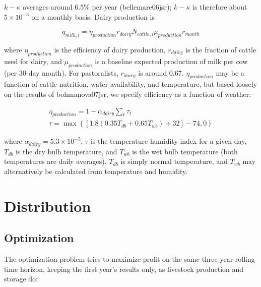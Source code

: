 \documentclass[letter,12pt]{article}
\begin{document}
$k-\kappa$ averages around 6.5\% per year (bellemare06jsr); $k-\kappa$ is therefore about $5 \times 10^{-3}$ on a monthly basis.  Dairy production is

\begin{equation}
q_{milk,i} = \eta_{production} r_{dairy} N_{cattle,i} \mu_{production} r_{month}
\end{equation}

\noindent where $\eta_{production}$ is the efficiency of dairy production, $r_{dairy}$ is the fraction of cattle used for dairy, and $\mu_{production}$ is a baseline expected production of milk per cow (per 30-day month).  For pastoralists, $r_{dairy}$ is around 0.67.  $\eta_{production}$ may be a function of cattle nutrition, water availability, and temperature, but based loosely on the results of bohmanova07jsr, we specify efficiency as a function of weather:

\begin{align}
\eta_{production} = 1- \alpha_{dairy} \sum_t \tau_t \\
\tau = \max \left\{\left[1.8 \left(0.35 T_{db} + 0.65 T_{wb}\right) + 32\right] - 74,0\right\}
\end{align}

\noindent where $\alpha_{dairy} = 5.3 \times 10^{-5}$, $\tau$ is the temperature-humidity index for a given day, $T_{db}$ is the dry bulb temperature, and $T_{wb}$ is the wet bulb temperature (both temperatures are daily averages).  $T_{db}$ is simply normal temperature, and $T_{wb}$ may alternatively be calculated from temperature and humidity.


\section{Distribution}

\subsection{Optimization}

The optimization problem tries to maximize profit on the same three-year rolling time horizon, keeping the first year's results only, as livestock production and storage do:
\end{document}
